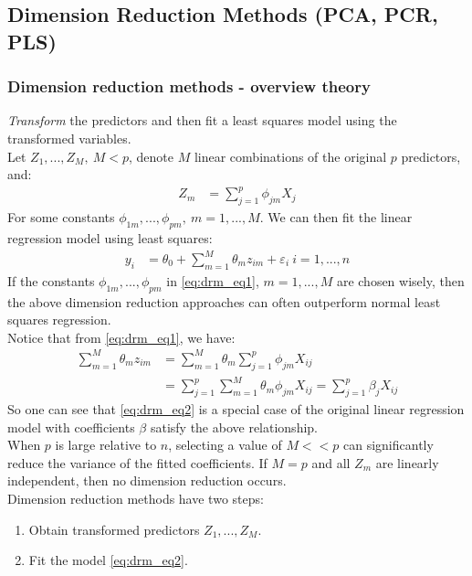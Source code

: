 \documentclass[11pt]{article}
\begin{document}
\subsection{Dimension Reduction Methods (PCA, PCR, PLS)}
\subsubsection{Dimension reduction methods - overview theory}
\noindent \textit{Transform} the predictors and then fit a least squares model using the transformed variables. \\

\noindent Let $Z_1,...,Z_M, \ M <p$, denote $M$ linear combinations of the original $p$ predictors, and:
\begin{align}
    Z_m &= \sum_{j=1}^{p}\phi_{jm}X_j \label{eq:drm_eq1}
\end{align}
\noindent For some constants $\phi_{1m},...,\phi_{pm}, \ m=1,...,M$. We can then fit the linear regression model using least squares:
\begin{align}
    y_i &= \theta_0 + \sum_{m=1}^{M}{\theta_m z_{im} + \varepsilon_i} \ i = 1,...,n \label{eq:drm_eq2}
\end{align}
\noindent If the constants $\phi_{1m},...,\phi_{pm}$ in \eqref{eq:drm_eq1}, $m=1,...,M$ are chosen wisely, then the above dimension reduction approaches can often outperform normal least squares regression. \\

\noindent Notice that from \eqref{eq:drm_eq1}, we have:
\begin{align*}
    \sum_{m=1}^{M}\theta_mz_{im} &= \sum_{m=1}^M\theta_m\sum_{j=1}^p{\phi_{jm}X_{ij}} \\
    &= \sum_{j=1}^{p}\sum_{m=1}^{M}\theta_m \phi_{jm}X_{ij} = \sum_{j=1}^{p}\beta_jX_{ij}
\end{align*}
\noindent So one can see that \eqref{eq:drm_eq2} is a special case of the original linear regression model with coefficients $\beta$ satisfy the above relationship. \\

\noindent When $p$ is large relative to $n$, selecting a value of $M << p$ can significantly reduce the variance of the fitted coefficients. If $M = p$ and all $Z_m$ are linearly independent, then no dimension reduction occurs. \\

\noindent Dimension reduction methods have two steps:
\begin{enumerate}
    \item Obtain transformed predictors $Z_1,...,Z_M$.
    \item Fit the model \eqref{eq:drm_eq2}.
\end{enumerate} \phantom{i}
\end{document}
